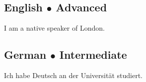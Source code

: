 \subsection{\fstar English $\bullet$ Advanced}
I am a native speaker of London.
\subsection{\mstar German $\bullet$ Intermediate}
Ich habe Deutsch an der Universität studiert.
